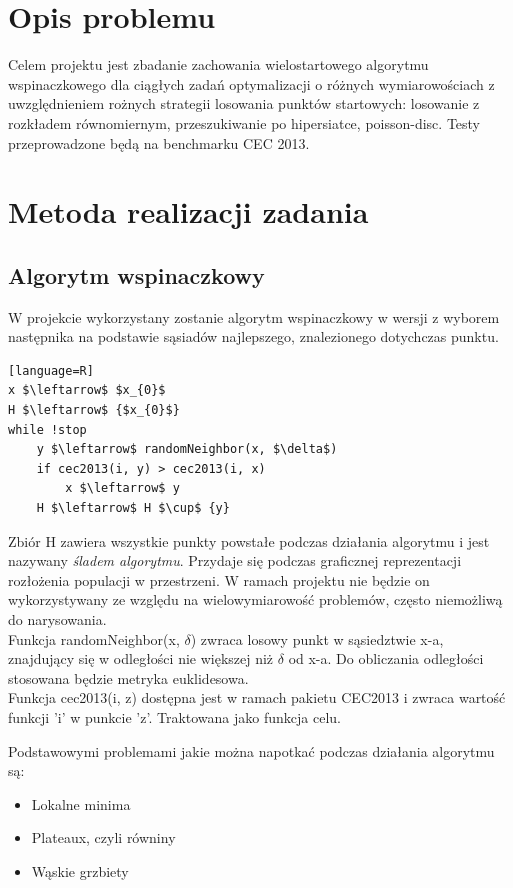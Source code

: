 \documentclass{article}
\begin{document}
\section{Opis problemu}

Celem projektu jest zbadanie zachowania wielostartowego algorytmu wspinaczkowego dla ciągłych zadań optymalizacji o różnych wymiarowościach z uwzględnieniem rożnych strategii losowania punktów startowych: losowanie z rozkładem równomiernym, przeszukiwanie po hipersiatce, poisson-disc. Testy przeprowadzone będą na benchmarku CEC 2013.\\



\section{Metoda realizacji zadania}

\subsection{Algorytm wspinaczkowy}

W projekcie wykorzystany zostanie algorytm wspinaczkowy w wersji z wyborem następnika na podstawie sąsiadów najlepszego, znalezionego dotychczas punktu.

\begin{lstlisting}[mathescape][language=R]
x $\leftarrow$ $x_{0}$
H $\leftarrow$ {$x_{0}$}
while !stop
	y $\leftarrow$ randomNeighbor(x, $\delta$)
	if cec2013(i, y) > cec2013(i, x)
		x $\leftarrow$ y
	H $\leftarrow$ H $\cup$ {y}
\end{lstlisting}
Zbiór H zawiera wszystkie punkty powstałe podczas działania algorytmu i jest nazywany \textit{śladem algorytmu}. Przydaje się podczas graficznej reprezentacji rozłożenia populacji w przestrzeni. W ramach projektu nie będzie on wykorzystywany ze względu na wielowymiarowość problemów, często niemożliwą do narysowania. \\
Funkcja randomNeighbor(x, $\delta$) zwraca losowy punkt w sąsiedztwie x-a, znajdujący się w odległości nie większej niż $\delta$ od x-a. Do obliczania odległości stosowana będzie metryka euklidesowa. \\
Funkcja cec2013(i, z) dostępna jest w ramach pakietu CEC2013 i zwraca wartość funkcji 'i' w punkcie 'z'. Traktowana jako funkcja celu.

Podstawowymi problemami jakie można napotkać podczas działania algorytmu są:
\begin{itemize}
	\item Lokalne minima
	\item Plateaux, czyli równiny
	\item Wąskie grzbiety
\end{itemize}
\end{document}
